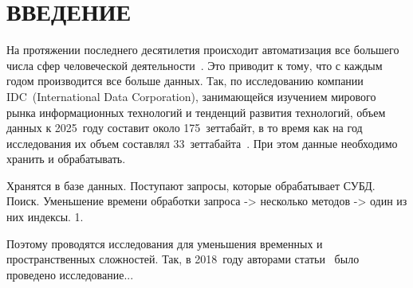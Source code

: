 \chapter*{ВВЕДЕНИЕ}

На протяжении последнего десятилетия происходит автоматизация все большего числа
сфер человеческой деятельности~\cite{koptenok}. Это приводит к тому, что с
каждым годом производится все больше данных. Так, по исследованию компании
IDC~(International Data Corporation), занимающейся изучением мирового рынка
информационных технологий и тенденций развития технологий, объем данных к
2025~году составит около 175~зеттабайт, в то время как на год исследования их
объем составлял 33~зеттабайта~\cite{idc}. При этом данные необходимо хранить и
обрабатывать.

Хранятся в базе данных. Поступают запросы, которые обрабатывает СУБД. Поиск.
Уменьшение времени обработки запроса -> несколько методов -> один из них
индексы. 1. 

Поэтому проводятся исследования для уменьшения временных и пространственных
сложностей. Так, в 2018~году авторами статьи~\cite{main} было проведено
исследование...


%
%
%
%
%
%

